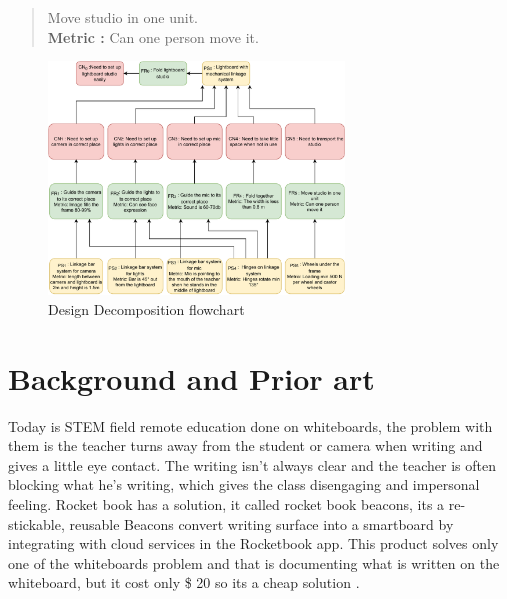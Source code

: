 \documentclass[a4paper]{jpconf}
\begin{document}
\begin{quote} 
	\textbf{} Move studio in one unit.
	\\ \textbf{Metric :} Can one person move it.
\end{quote}


\begin{figure}[]
	\centering
	\includegraphics [width=0.7\textwidth]{matrix.pdf}
	\caption{Design Decomposition flowchart}\label{fig:matrix}
\end{figure}




\section{Background and Prior art}

Today is STEM field remote education done on whiteboards, the problem with them is the teacher turns away from the student or camera when writing and gives a little eye contact. The writing isn't always clear and the teacher is often blocking what he's writing, which gives the class disengaging and impersonal feeling. 
Rocket book has a solution, it called rocket book beacons, its a re-stickable, reusable Beacons convert writing surface into a smartboard by integrating with cloud services in the Rocketbook app.
This product solves only one of the whiteboards problem and that is documenting what is written on the whiteboard, but it cost only \$ 20 so its a cheap solution \cite{Rocketbook}.
\end{document}
